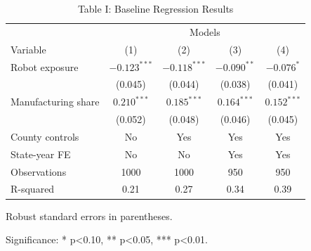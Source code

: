 \begin{table}[htbp]
\centering
\caption{Table I: Baseline Regression Results}
\begin{threeparttable}
\begin{tabular}{lcccc}
\toprule
 & \multicolumn{4}{c}{Models} \\
Variable & (1) & (2) & (3) & (4) \\
\midrule
Robot exposure & $-0.123^{***}$ & $-0.118^{***}$ & $-0.090^{**}$ & $-0.076^{*}$ \\
 & (0.045) & (0.044) & (0.038) & (0.041) \\
Manufacturing share & $0.210^{***}$ & $0.185^{***}$ & $0.164^{***}$ & $0.152^{***}$ \\
 & (0.052) & (0.048) & (0.046) & (0.045) \\
County controls & No & Yes & Yes & Yes \\
State-year FE & No & No & Yes & Yes \\
Observations & 1000 & 1000 & 950 & 950 \\
R-squared & 0.21 & 0.27 & 0.34 & 0.39 \\
\bottomrule
\end{tabular}
\begin{tablenotes}[flushleft]
\item Robust standard errors in parentheses.
\item Significance: * p<0.10, ** p<0.05, *** p<0.01.
\end{tablenotes}
\end{threeparttable}
\end{table}
